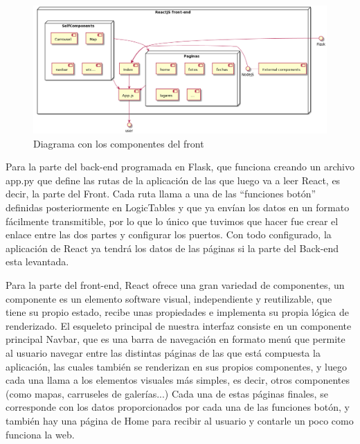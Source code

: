 \begin{figure}
	\begin{center}
		\includegraphics[scale=0.33]{Imagenes/Fuentes/diagrama_front_end.png} \caption{Diagrama con los componentes del front}
		\label{Diagrama_backend}
	\end{center}
\end{figure}



Para la parte del back-end programada en Flask, que funciona creando un archivo app.py que define las rutas de la aplicación de las que luego va a leer React, es decir, la parte del Front. Cada ruta llama a una de las ``funciones botón'' definidas posteriormente en LogicTables y que ya envían los datos en un formato fácilmente transmitible, por lo que lo único que tuvimos que hacer fue crear el enlace entre las dos partes y configurar los puertos. Con todo configurado, la aplicación de React ya tendrá los datos de las páginas si la parte del Back-end esta levantada.

Para la parte del front-end, React ofrece una gran variedad de componentes, un componente es un elemento software visual, independiente y reutilizable, que tiene su propio estado, recibe unas propiedades e implementa su propia lógica de renderizado. El esqueleto principal de nuestra interfaz consiste en un componente principal Navbar, que es una barra de navegación en formato menú que permite al usuario navegar entre las distintas páginas de las que está compuesta la aplicación, las cuales también se renderizan en sus propios componentes, y luego cada una llama a los elementos visuales más simples, es decir, otros componentes (como mapas, carruseles de galerías...) Cada una de estas páginas finales, se corresponde con los datos proporcionados por cada una de las funciones botón, y también hay una página de Home para recibir al usuario y contarle un poco como funciona la web.

